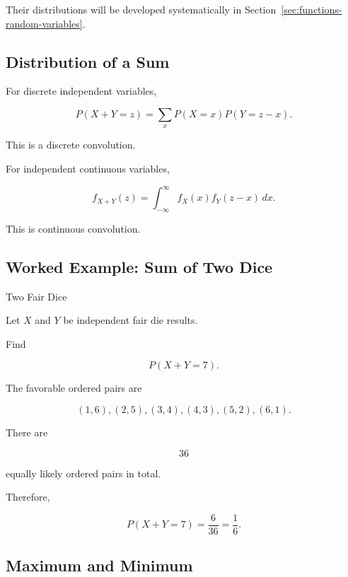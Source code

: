 Their distributions will be developed systematically in
Section~\ref{sec:functions-random-variables}.

\subsection{Distribution of a Sum}
\label{subsec:distribution-sum-preview}

For discrete independent variables,

\[
\boxed{
P(X+Y=z)
=
\sum_x
P(X=x)P(Y=z-x).
}
\]

This is a discrete convolution.

For independent continuous variables,

\[
\boxed{
f_{X+Y}(z)
=
\int_{-\infty}^{\infty}
f_X(x)f_Y(z-x)\,dx.
}
\]

This is continuous convolution.

\subsection{Worked Example: Sum of Two Dice}
\label{subsec:worked-sum-two-dice}

\begin{workedexamplebox}{Two Fair Dice}

Let \(X\) and \(Y\) be independent fair die results.

Find

\[
P(X+Y=7).
\]

The favorable ordered pairs are

\[
(1,6),
(2,5),
(3,4),
(4,3),
(5,2),
(6,1).
\]

There are

\[
36
\]

equally likely ordered pairs in total.

Therefore,

\begin{answerbox}
\[
\boxed{
P(X+Y=7)
=
\frac6{36}
=
\frac16.
}
\]
\end{answerbox}

\end{workedexamplebox}

\subsection{Maximum and Minimum}
\label{subsec:max-min-joint-preview}

